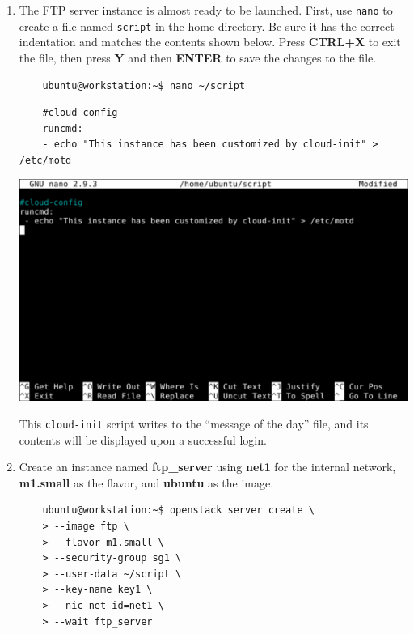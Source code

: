 \documentclass[letterpaper, 12pt]{article}
\begin{document}
\begin{enumerate}
    \item The FTP server instance is almost ready to be launched. First, use \texttt{nano} to create a file named
    \texttt{script} in the home directory. Be sure it has the correct indentation and matches the contents shown below.
    Press \textbf{CTRL+X} to exit the file, then press \textbf{Y} and then \textbf{ENTER} to save the changes to the
    file.
    \begin{lstlisting}
    ubuntu@workstation:~$ nano ~/script
    \end{lstlisting}
    \begin{lstlisting}
    #cloud-config
    runcmd:
    - echo "This instance has been customized by cloud-init" > /etc/motd
    \end{lstlisting}

    \begin{center}
        \includegraphics[width=\linewidth]{images/part1/step34.png}
    \end{center}

    \begin{notebox}
        This \texttt{cloud-init} script writes to the ``message of the day'' file, and its contents will be displayed
        upon a successful login.
    \end{notebox}

    \item Create an instance named \textbf{ftp\_server} using \textbf{net1} for the internal network, \textbf{m1.small}
    as the flavor, and \textbf{ubuntu} as the image.
    \begin{lstlisting}
    ubuntu@workstation:~$ openstack server create \
    > --image ftp \
    > --flavor m1.small \
    > --security-group sg1 \
    > --user-data ~/script \
    > --key-name key1 \
    > --nic net-id=net1 \
    > --wait ftp_server
    \end{lstlisting}


\end{enumerate}
\end{document}
